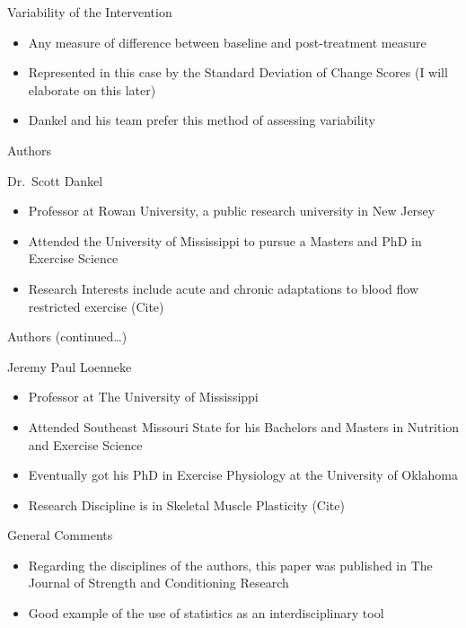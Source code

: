 \documentclass[
  ignorenonframetext,
  aspectratio=169,
]{beamer}
\providecommand{\tightlist}{%
  \setlength{\itemsep}{0pt}\setlength{\parskip}{0pt}}
\begin{document}
\begin{frame}{Variability of the Intervention}
\protect\hypertarget{variability-of-the-intervention}{}
\begin{itemize}
\tightlist
\item
  Any measure of difference between baseline and post-treatment measure
\item
  Represented in this case by the Standard Deviation of Change Scores (I
  will elaborate on this later)
\item
  Dankel and his team prefer this method of assessing variability
\end{itemize}
\end{frame}

\begin{frame}{Authors}
\protect\hypertarget{authors}{}
\begin{block}{Dr.~Scott Dankel}
\protect\hypertarget{dr.-scott-dankel}{}
\begin{itemize}
\tightlist
\item
  Professor at Rowan University, a public research university in New
  Jersey
\item
  Attended the University of Mississippi to pursue a Masters and PhD in
  Exercise Science
\item
  Research Interests include acute and chronic adaptations to blood flow
  restricted exercise (Cite)
\end{itemize}
\end{block}
\end{frame}

\begin{frame}{Authors (continued\ldots)}
\protect\hypertarget{authors-continued}{}
\begin{block}{Jeremy Paul Loenneke}
\protect\hypertarget{jeremy-paul-loenneke}{}
\begin{itemize}
\tightlist
\item
  Professor at The University of Mississippi
\item
  Attended Southeast Missouri State for his Bachelors and Masters in
  Nutrition and Exercise Science
\item
  Eventually got his PhD in Exercise Physiology at the University of
  Oklahoma
\item
  Research Discipline is in Skeletal Muscle Plasticity (Cite)
\end{itemize}
\end{block}

\begin{block}{General Comments}
\protect\hypertarget{general-comments}{}
\begin{itemize}
\tightlist
\item
  Regarding the disciplines of the authors, this paper was published in
  The Journal of Strength and Conditioning Research
\item
  Good example of the use of statistics as an interdisciplinary tool
\end{itemize}
\end{block}
\end{frame}
\end{document}
